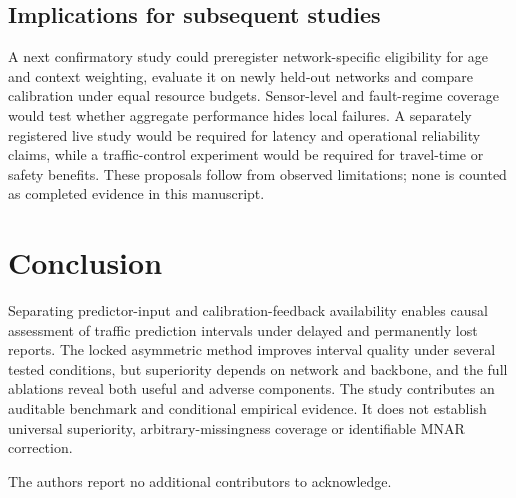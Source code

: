 \documentclass[pdflatex,sn-mathphys-num]{sn-jnl}
\begin{document}
\subsection{Implications for subsequent studies}
A next confirmatory study could preregister network-specific eligibility for age and context weighting, evaluate it on newly held-out networks and compare calibration under equal resource budgets. Sensor-level and fault-regime coverage would test whether aggregate performance hides local failures. A separately registered live study would be required for latency and operational reliability claims, while a traffic-control experiment would be required for travel-time or safety benefits. These proposals follow from observed limitations; none is counted as completed evidence in this manuscript.

\section{Conclusion}\label{sec:conclusion}

Separating predictor-input and calibration-feedback availability enables causal assessment of traffic prediction intervals under delayed and permanently lost reports. The locked asymmetric method improves interval quality under several tested conditions, but superiority depends on network and backbone, and the full ablations reveal both useful and adverse components. The study contributes an auditable benchmark and conditional empirical evidence. It does not establish universal superiority, arbitrary-missingness coverage or identifiable MNAR correction.

\FloatBarrier
\FloatBarrier
\backmatter
{}
The authors report no additional contributors to acknowledge.
\end{document}
